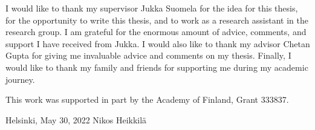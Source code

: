 I would like to thank my supervisor Jukka Suomela for the idea for this thesis, for the opportunity to write this thesis, and to work as a research assistant in the research group.
I am grateful for the enormous amount of advice, comments, and support I have received from Jukka.
I would also like to thank my advisor Chetan Gupta for giving me invaluable advice and comments on my thesis.
Finally, I would like to thank my family and friends for supporting me during my academic journey.

This work was supported in part by the Academy of Finland, Grant 333837.
\vspace{5cm}

Helsinki, May 30, 2022
\vspace{5mm}
{\hfill Nikos Heikkilä \hspace{1cm}}
